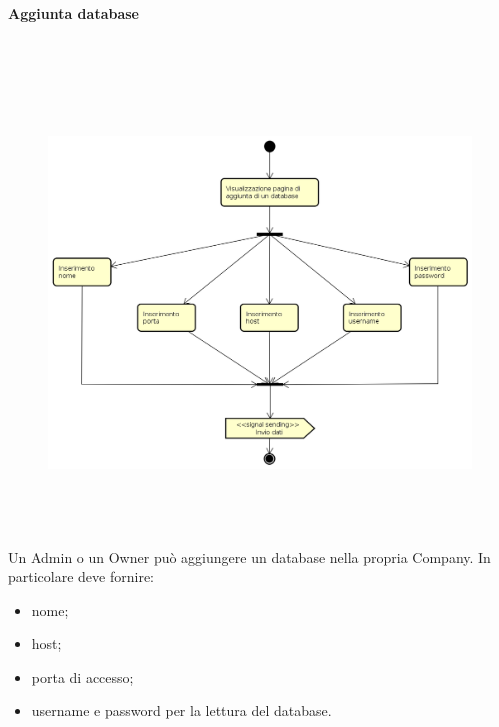 \paragraph{Aggiunta database} \mbox{} \\
\begin{figure}[H]
\begin{center}
\includegraphics[height=12cm]{res/sections/backend/activities/aggiuntaDatabase.png}
\end{center}
\end{figure}
Un Admin o un Owner può aggiungere un database nella propria Company. In particolare deve fornire:
\begin{itemize}
\item nome;
\item host;
\item porta di accesso;
\item username e password per la lettura del database.
\end{itemize}
